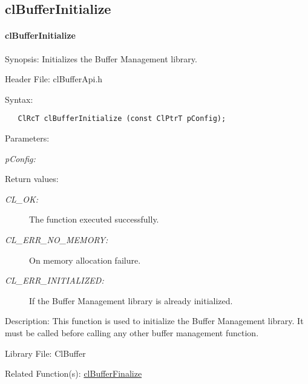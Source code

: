 \subsection{clBufferInitialize}
 \hypertarget{pagebuf101}{}\paragraph{cl\-Buffer\-Initialize}\label{pagebuf101}
\begin{Desc}
\item[Synopsis:]Initializes the Buffer Management library.\end{Desc}
\begin{Desc}
\item[Header File:]clBufferApi.h\end{Desc}
\begin{Desc}
\item[Syntax:]

\footnotesize\begin{verbatim}   ClRcT clBufferInitialize (const ClPtrT pConfig);
\end{verbatim}
\normalsize
\end{Desc}
\begin{Desc}
\item[Parameters:]
\begin{description}
\item[{\em p\-Config:}] 
\end{description}
\end{Desc}
\begin{Desc}
\item[Return values:]
\begin{description}
\item[{\em CL\_\-OK:}]The function executed successfully. 
\item[{\em CL\_\-ERR\_\-NO\_\-MEMORY:}]On memory allocation failure. 
\item[{\em CL\_\-ERR\_\-INITIALIZED:}]If the Buffer Management library is already initialized.\end{description}
\end{Desc}
\begin{Desc}
\item[Description:]This function is used to initialize the Buffer Management library. It must be called before calling any other buffer management 
function.\end{Desc}
\begin{Desc}
\item[Library File:]Cl\-Buffer\end{Desc}
\begin{Desc}
\item[Related Function(s):]\hyperlink{pagebuf102}{cl\-Buffer\-Finalize} \end{Desc}


